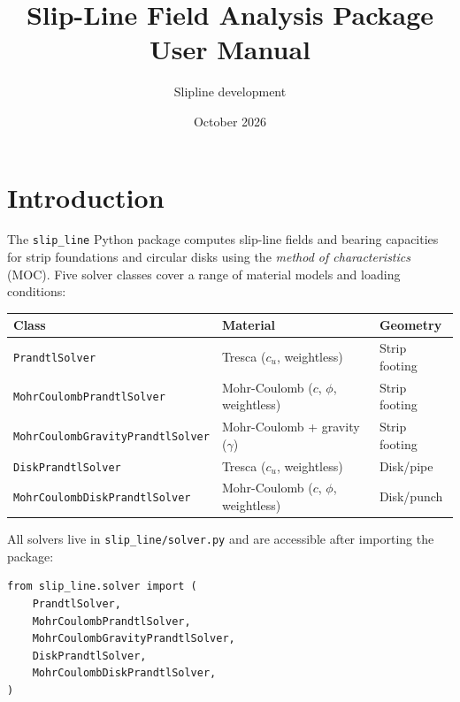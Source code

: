 \documentclass[11pt,a4paper]{article}
\title{%
  \textbf{Slip-Line Field Analysis Package}\\[0.5em]
  \large User Manual
}
\author{Slip\textunderscore line development}
\date{October 2026}
\newcommand{\pkg}{\texttt{slip\_line}}
\begin{document}
\maketitle
\tableofcontents
\newpage

\section{Introduction}
\label{sec:intro}

The \pkg{} Python package computes slip-line fields and bearing
capacities for strip foundations and circular disks using the
\emph{method of characteristics} (MOC).
Five solver classes cover a range of material models and loading
conditions:

\begin{center}
\begin{tabular}{lll}
\toprule
\textbf{Class} & \textbf{Material} & \textbf{Geometry} \\
\midrule
\texttt{PrandtlSolver} & Tresca ($c_u$, weightless) & Strip footing \\
\texttt{MohrCoulombPrandtlSolver} & Mohr-Coulomb ($c$, $\phi$, weightless) & Strip footing \\
\texttt{MohrCoulombGravityPrandtlSolver} & Mohr-Coulomb + gravity ($\gamma$) & Strip footing \\
\texttt{DiskPrandtlSolver} & Tresca ($c_u$, weightless) & Disk/pipe \\
\texttt{MohrCoulombDiskPrandtlSolver} & Mohr-Coulomb ($c$, $\phi$, weightless) & Disk/punch \\
\bottomrule
\end{tabular}
\end{center}

All solvers live in \texttt{slip\_line/solver.py} and are accessible
after importing the package:
\begin{lstlisting}
from slip_line.solver import (
    PrandtlSolver,
    MohrCoulombPrandtlSolver,
    MohrCoulombGravityPrandtlSolver,
    DiskPrandtlSolver,
    MohrCoulombDiskPrandtlSolver,
)
\end{lstlisting}
\end{document}
